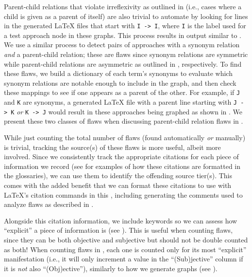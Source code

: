 \label{selfParDef}
Parent-child relations that violate irreflexivity as outlined in
 (i.e., cases where a child is given as a parent of itself)
are also trivial to automate by looking for lines in the
generated \LaTeX{} files that start with \texttt{I~->~I}, where \texttt{I}
is the label used for a test approach node in these graphs. This process
results in output similar to .%
\label{parSynDef} We use a similar
process to detect pairs of approaches with a synonym relation \emph{and} a
parent-child relation; these are flaws since synonym relations are symmetric
while parent-child relations are asymmetric as outlined in , respectively. To find these flaws, we build a dictionary of
each term's synonyms to evaluate which synonym relations are notable enough
to include in the graph, and then check these mappings to see if one appears
as a parent of the other. For example, if \texttt{J} and \texttt{K} are
synonyms, a generated \LaTeX{} file with a parent line starting with
\texttt{J~->~K} \emph{or} \texttt{K~->~J} would result in these approaches
being graphed as shown in . We present these two
classes of flaws when discussing parent-child relation flaws in .

While just counting the total number of flaws (found automatically \emph{or}
manually) is trivial, tracking
the source(s) of these flaws is more useful, albeit more involved. Since
we consistently track the appropriate citations for each piece of information
we record (see  for examples
of how these citations are formatted in the glossaries), we can use them to
identify the offending source tier(s). This comes with the added benefit that
we can format these citations to use with \LaTeX{}'s citation commands in this
\docType{}, including generating the comments used to analyze flaws as
described in .

\label{auto-flaw-analysis-explicitness}
Alongside this citation information, we include keywords so we can assess how
``explicit'' a piece of information is (see ). This is
useful when counting flaws, since they can be both objective and subjective but
should not be double counted as both! When counting
flaws in , each one is counted only for its
most ``explicit'' manifestation (i.e., it will only increment a value in the
``(Sub)jective'' column if it is \emph{not} also ``(Obj)ective''),
similarly to how we generate graphs (see ).

